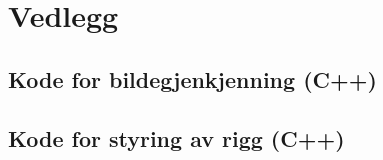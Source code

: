 \documentclass[a4paper, 11pt]{article}
\begin{document}
 \newpage
\section{Vedlegg}

\subsection{Kode for bildegjenkjenning (C++)}

\subsection{Kode for styring av rigg (C++)}
\end{document}
